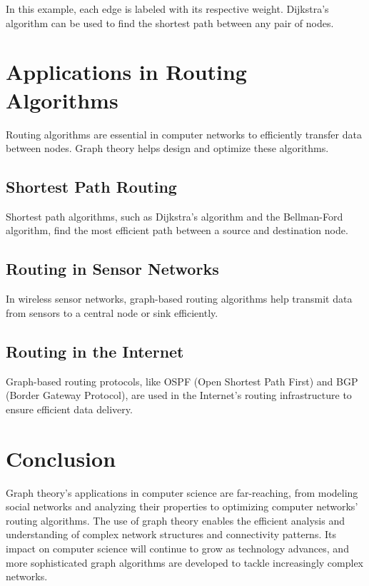 \documentclass{article}
\begin{document}
\begin{center}
\end{center}

In this example, each edge is labeled with its respective weight. Dijkstra's algorithm can be used to find the shortest path between any pair of nodes.

\section{Applications in Routing Algorithms}
Routing algorithms are essential in computer networks to efficiently transfer data between nodes. Graph theory helps design and optimize these algorithms.

\subsection{Shortest Path Routing}
Shortest path algorithms, such as Dijkstra's algorithm and the Bellman-Ford algorithm, find the most efficient path between a source and destination node.

\subsection{Routing in Sensor Networks}
In wireless sensor networks, graph-based routing algorithms help transmit data from sensors to a central node or sink efficiently.

\subsection{Routing in the Internet}
Graph-based routing protocols, like OSPF (Open Shortest Path First) and BGP (Border Gateway Protocol), are used in the Internet's routing infrastructure to ensure efficient data delivery.

\section{Conclusion}
Graph theory's applications in computer science are far-reaching, from modeling social networks and analyzing their properties to optimizing computer networks' routing algorithms. The use of graph theory enables the efficient analysis and understanding of complex network structures and connectivity patterns. Its impact on computer science will continue to grow as technology advances, and more sophisticated graph algorithms are developed to tackle increasingly complex networks.
\end{document}
